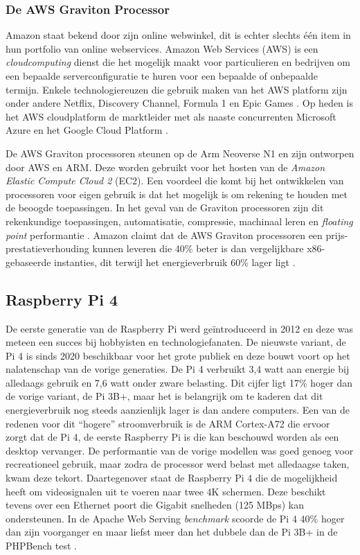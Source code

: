 \subsubsection{De AWS Graviton Processor}
Amazon staat bekend door zijn online webwinkel, dit is echter slechts één item in hun portfolio van online webservices. Amazon Web Services (AWS) is een \textit{cloudcomputing} dienst die het mogelijk maakt voor particulieren en bedrijven om een bepaalde serverconfiguratie te huren voor een bepaalde of onbepaalde termijn. Enkele technologiereuzen die gebruik maken van het AWS platform zijn onder andere Netflix, Discovery Channel, Formula 1 en Epic Games \autocite{Amazon2022}. Op heden is het AWS cloudplatform de marktleider met als naaste concurrenten Microsoft Azure en het Google Cloud Platform \autocite{Alexandre2021}.

De AWS Graviton processoren steunen op de Arm Neoverse N1 en zijn ontworpen door AWS en ARM. Deze worden gebruikt voor het hosten van de \textit{Amazon Elastic Compute Cloud 2} (EC2). Een voordeel die komt bij het ontwikkelen van processoren voor eigen gebruik is dat het mogelijk is om rekening te houden met de beoogde toepassingen. In het geval van de Graviton processoren zijn dit rekenkundige toepassingen, automatisatie, compressie, machinaal leren en \textit{floating point} performantie \autocite{arm2021}. Amazon claimt dat de AWS Graviton processoren een prijs-prestatieverhouding kunnen leveren die 40\% beter is dan vergelijkbare x86-gebaseerde instanties, dit terwijl het energieverbruik 60\% lager ligt \autocite{Amazon2021}.

\subsection{Raspberry Pi 4}
De eerste generatie van de Raspberry Pi werd geïntroduceerd in 2012 en deze was meteen een succes bij hobbyisten en technologiefanaten. De nieuwste variant, de Pi 4 is sinds 2020 beschikbaar voor het grote publiek en deze bouwt voort op het nalatenschap van de vorige generaties. De Pi 4 verbruikt 3,4 watt aan energie bij alledaags gebruik en 7,6 watt onder zware belasting. Dit cijfer ligt 17\% hoger dan de vorige variant, de Pi 3B+, maar het is belangrijk om te kaderen dat dit energieverbruik nog steeds aanzienlijk lager is dan andere computers. Een van de redenen voor dit “hogere” stroomverbruik is de ARM Cortex-A72 die ervoor zorgt dat de Pi 4, de eerste Raspberry Pi is die kan beschouwd worden als een desktop vervanger. De performantie van de vorige modellen was goed genoeg voor recreationeel gebruik, maar zodra de processor werd belast met alledaagse taken, kwam deze tekort. Daartegenover staat de Raspberry Pi 4 die de mogelijkheid heeft om videosignalen uit te voeren naar twee 4K schermen. Deze beschikt tevens over een Ethernet poort die Gigabit snelheden (125 MBps) kan ondersteunen. In de Apache Web Serving \textit{benchmark} scoorde de Pi 4 40\% hoger dan zijn voorganger en maar liefst meer dan het dubbele dan de Pi 3B+ in de PHPBench test \autocite{Piltch2020}.

